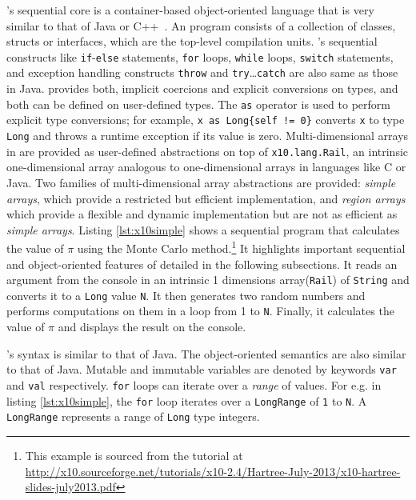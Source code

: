\xten's sequential core is a container-based object-oriented language that is
very similar to that of Java or C++~\cite{specs}. An \xten program consists of a
collection of classes, structs or interfaces, which are the top-level
compilation units.
\xten's sequential constructs like \texttt{if}-\texttt{else} statements,
\texttt{for} loops, \texttt{while} loops, \texttt{switch} statements, and
exception handling constructs \texttt{throw} and
\texttt{try}\ldots\texttt{catch} are also same as those in Java.  \xten provides
both, implicit coercions and explicit conversions on types, and both can be
defined on user-defined types. The \texttt{as} operator is used to perform
explicit type conversions; for example, \texttt{x as Long\{self != 0\}} converts
\texttt{x} to type \texttt{Long} and throws a runtime exception if its value is
zero. Multi-dimensional arrays in \xten are provided as user-defined
abstractions on top of \texttt{x10.lang.Rail}, an intrinsic one-dimensional
array analogous to one-dimensional arrays in languages like C or Java. Two
families of multi-dimensional array abstractions are provided: \emph{simple
arrays}, which provide a restricted but efficient implementation, and
\emph{region arrays} which provide a flexible and dynamic implementation but are
not as efficient as \emph{simple arrays}.  Listing \ref{lst:x10simple} shows a
sequential \xten program that calculates the value of $\pi$ using the Monte
Carlo method.\footnote{This example is sourced from the tutorial at
\url{http://x10.sourceforge.net/tutorials/x10-2.4/Hartree-July-2013/x10-hartree-slides-july2013.pdf}}
It highlights important sequential and object-oriented features of \xten
detailed in the following subsections. It reads an argument from the console in an
intrinsic 1 dimensions array(\texttt{Rail}) of \texttt{String} and converts it
to a \texttt{Long} value \texttt{N}. It then generates two random numbers and
performs computations on them in a loop from 1 to \texttt{N}. Finally, it
calculates the value of $\pi$ and displays the result on the console. 

\xten's syntax is similar to that of
Java. The object-oriented semantics are also similar to that of Java. 
Mutable and immutable variables are denoted by keywords \texttt{var} and
\texttt{val} respectively. \texttt{for} loops can iterate over a \emph{range} of
values. For e.g. in listing \ref{lst:x10simple}, the \texttt{for} loop iterates
over a \texttt{LongRange} of \texttt{1} to \texttt{N}. A \texttt{LongRange}
represents a range of \texttt{Long} type integers.  

